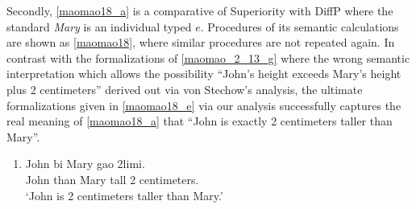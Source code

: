 \documentclass{ctexart}
\begin{document}
Secondly, \ref{maomao18_a} is a comparative of Superiority with DiffP where the standard \textit{Mary} is an individual typed $e$. Procedures of its semantic calculations are shown as \ref{maomao18}, where similar procedures are not repeated again. In contrast with the formalizations of \ref{maomao_2_13_g} where the wrong semantic interpretation which allows the possibility ``John's height exceeds Mary's height plus 2 centimeters'' derived out via von Stechow's analysis, the ultimate formalizations given in \ref{maomao18_e} via our analysis successfully captures the real meaning of \ref{maomao18_a} that ``John is exactly 2 centimeters taller than Mary''.

\begin{enumerate}
    \item \label{maomao18_a}
    John bi Mary gao 2limi. \\
    John than Mary tall 2 centimeters. \\
    `John is 2 centimeters taller than Mary.'
\end{enumerate}
\end{document}

